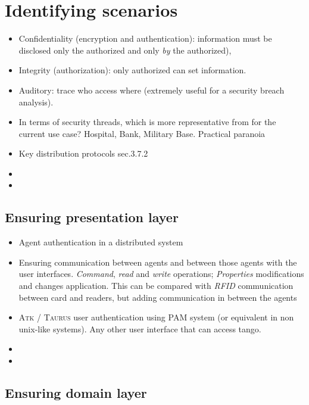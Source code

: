\documentclass[10pt,a4paper,twoside]{llncs}
\newcommand{\taurus}{\textsc{Taurus} }
\newcommand{\atk}{\textsc{Atk} }
\begin{document}
%
\section{Identifying scenarios \label{sec:scenarios}}

\begin{itemize}
 \item Confidentiality (encryption and authentication): information must be disclosed only  the authorized and only \emph{by} the authorized),
 \item Integrity (authorization): only authorized can set information.
 \item Auditory: trace who access where (extremely useful for a security breach analysis).
 \item In terms of security threads, which is more representative from \cite{SecEngRossAnderson} for the current use case? Hospital, Bank, Military Base. Practical paranoia \cite{PractCryptoSchneier}
 \item Key distribution protocols \cite{SecEngRossAnderson} sec.3.7.2
 \item 
 \item 
\end{itemize}

%
\subsection{Ensuring presentation layer}

\begin{itemize}
 \item Agent authentication in a distributed system
 \item Ensuring communication between agents and between those agents with the user interfaces. \emph{Command}, \emph{read} and \emph{write} operations; \emph{Properties} modifications and changes application. This can be compared with \emph{RFID} communication between card and readers, but adding communication in between the agents
 \item \atk/ \taurus user authentication using PAM system (or equivalent in non unix-like systems). Any other user interface that can access tango.
 \item 
 \item 
\end{itemize}

%
\subsection{Ensuring domain layer}
\end{document}
